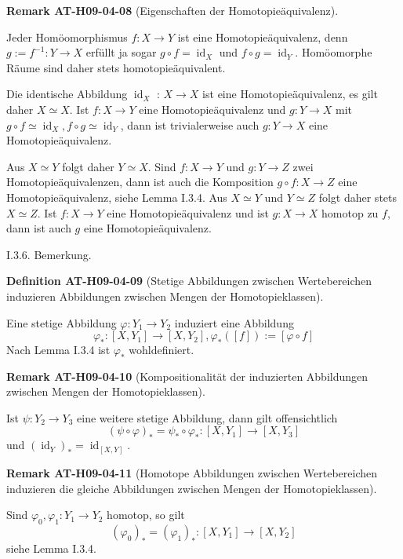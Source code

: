 \documentclass[10pt, letterpaper]{article}
\newcommand{\CustomHeading}[3]{%
  \par\medskip\noindent%
  \textbf{#1 #2} \textnormal{(#3)}.\enskip%
}
\newenvironment{DEF}[2]{\begin{unitbox}\CustomHeading{Definition}{#1}{#2}}{\end{unitbox}}
\newenvironment{REM}[2]{\begin{unitbox}\CustomHeading{Remark}{#1}{#2}}{\end{unitbox}}
\begin{document}
\begin{REM}{AT-H09-04-08}{Eigenschaften der Homotopieäquivalenz}
Jeder Homöomorphismus $f: X \rightarrow Y$ ist eine Homotopieäquivalenz, denn $g:=f^{-1}: Y \rightarrow X$ erfüllt ja sogar $g \circ f=\operatorname{id}_{X}$ und $f \circ g=\operatorname{id}_{Y}$. Homöomorphe Räume sind daher stets homotopieäquivalent. 

Die identische Abbildung $\operatorname{id}_{X}$ : $X \rightarrow X$ ist eine Homotopieäquivalenz, es gilt daher $X \simeq X$. Ist $f: X \rightarrow Y$ eine Homotopieäquivalenz und $g: Y \rightarrow X$ mit $g \circ f \simeq \operatorname{id}_{X}, f \circ g \simeq \operatorname{id}_{Y}$, dann ist trivialerweise auch $g: Y \rightarrow X$ eine Homotopieäquivalenz. 

Aus $X \simeq Y$ folgt daher $Y \simeq X$. Sind $f: X \rightarrow Y$ und $g: Y \rightarrow Z$ zwei Homotopieäquivalenzen, dann ist auch die Komposition $g \circ f: X \rightarrow Z$ eine Homotopieäquivalenz, siehe Lemma I.3.4. Aus $X \simeq Y$ und $Y \simeq Z$ folgt daher stets $X \simeq Z$. Ist $f: X \rightarrow Y$ eine Homotopieäquivalenz und ist $g: X \rightarrow X$ homotop zu $f$, dann ist auch $g$ eine Homotopieäquivalenz.
\end{REM}


I.3.6. Bemerkung. 

\begin{DEF}{AT-H09-04-09}{Stetige Abbildungen zwischen Wertebereichen induzieren Abbildungen zwischen Mengen der Homotopieklassen}
Eine stetige Abbildung $\varphi: Y_{1} \rightarrow Y_{2}$ induziert eine Abbildung 
$$\varphi_{*}:\left[X, Y_{1}\right] \rightarrow\left[X, Y_{2}\right], \varphi_{*}([f]):=[\varphi \circ f]$$ 
Nach Lemma I.3.4 ist $\varphi_{*}$ wohldefiniert.
\end{DEF}

\begin{REM}{AT-H09-04-10}{Kompositionalität der induzierten Abbildungen zwischen Mengen der Homotopieklassen}
Ist $\psi: Y_{2} \rightarrow Y_{3}$ eine weitere stetige Abbildung, dann gilt offensichtlich 
$$(\psi \circ \varphi)_{*}=\psi_{*} \circ \varphi_{*}:\left[X, Y_{1}\right] \rightarrow\left[X, Y_{3}\right]$$ 
und $\left(\operatorname{id}_{Y}\right)_{*}=\operatorname{id}_{[X, Y]}$.
\end{REM}

\begin{REM}{AT-H09-04-11}{Homotope Abbildungen zwischen Wertebereichen induzieren die gleiche Abbildungen zwischen Mengen der Homotopieklassen}
Sind $\varphi_{0}, \varphi_{1}: Y_{1} \rightarrow Y_{2}$ homotop, so gilt $$\left(\varphi_{0}\right)_{*}=\left(\varphi_{1}\right)_{*}:\left[X, Y_{1}\right] \rightarrow\left[X, Y_{2}\right]$$ 
siehe Lemma I.3.4.
\end{REM}
\end{document}
